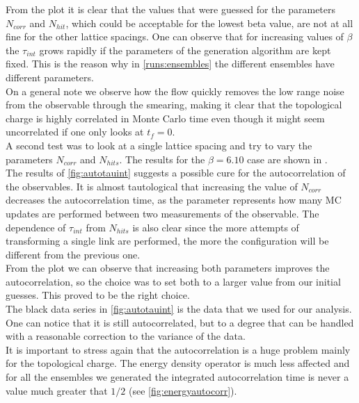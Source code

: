 From the plot it is clear that the values that were guessed for the parameters $N_{corr}$ and $N_{hit}$, which could be acceptable for the lowest beta value, are not at all fine for the other lattice spacings. One can observe that for increasing values of $\beta$ the $\tau_{int}$ grows rapidly if the parameters of the generation algorithm are kept fixed.  This is the reason why in \cref{runs:ensembles} the different ensembles have different parameters.\\
On a general note we observe how the flow quickly removes the low range noise from the observable through the smearing, making it clear that the topological charge is highly correlated in Monte Carlo time even though it might seem uncorrelated if one only looks at $t_f = 0$. \\
A second test was to look at a single lattice spacing and try to vary the parameters $N_{corr}$ and $N_{hits}$. The results for the $\beta=6.10$ case are shown in . 
\\
The results of \cref{fig:autotauint} suggests a possible cure for the autocorrelation of the observables. It is almost tautological that increasing the value of $N_{corr}$ decreases the autocorrelation time, as the parameter represents how many MC updates are performed between two measurements of the observable. The dependence of $\tau_{int}$ from $N_{hits}$ is also clear since the more attempts of transforming a single link are performed, the more the configuration will be different from the previous one. \\
From the plot we can observe that increasing both parameters improves the autocorrelation, so the choice was to set both to a larger value from our initial guesses. This proved to be the right choice. \\
The black data series in  \cref{fig:autotauint} is the data that we used for our analysis. One can notice that it is still autocorrelated, but to a degree that can be handled with a reasonable correction to the variance of the data. \\
It is important to stress again that the autocorrelation is a huge problem mainly for the topological charge. The energy density operator is much less affected and for all the ensembles we generated the integrated autocorrelation time is never a value much greater that $1/2$ (see \cref{fig:energyautocorr}). 


